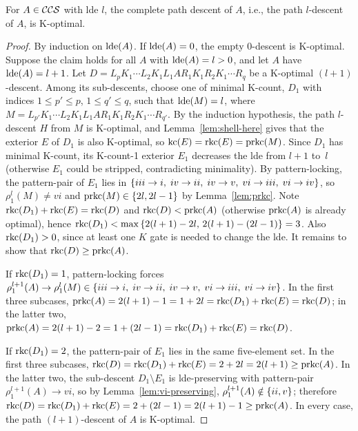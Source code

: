 \documentclass[reprint,amsmath,amssymb,aps,pra]{revtex4-2}
\begin{document}
\begin{lemma}
  For $A\in {\mathcal{CCS}}$ with lde $l$, the complete path descent of
  $A$, i.e., the path $l$-descent of $A$, is K-optimal.
\end{lemma}
\begin{proof}
  By induction on $\operatorname{lde}(A)$. If $\operatorname{lde}(A)=0$, the empty $0$-descent is
  K-optimal. Suppose the claim holds for all $A$ with
  $\operatorname{lde}(A) = l > 0$, and let $A$ have $\operatorname{lde}(A) = l+1$. Let
  $D = L_pK_1\cdots L_2K_1L_1AR_1K_1R_2K_1\cdots R_q$ be a K-optimal
  $(l+1)$-descent. Among its sub-descents, choose one of minimal
  K-count, $D_1$ with indices $1\le p'\le p$, $1\le q' \le q$, such
  that $\operatorname{lde}(M) = l$, where
  $M = L_{p'}K_1\cdots L_2K_1L_1AR_1K_1R_2K_1\cdots R_{q'}$. By the
  induction hypothesis, the path $l$-descent $H$ from $M$ is
  K-optimal, and Lemma~\ref{lem:shell-here} gives that the exterior
  $E$ of $D_1$ is also K-optimal, so $\operatorname{kc}(E) =\operatorname{rkc}(E) =
  \operatorname{prkc}(M)$. Since $D_1$ has minimal K-count, its K-count-1 exterior
  $E_1$ decreases the lde from $l+1$ to~$l$ (otherwise $E_1$ could be
  stripped, contradicting minimality). By pattern-locking, the
  pattern-pair of $E_1$ lies in
  $ \left\{iii \rightarrow i,\; iv \rightarrow ii,\; iv \rightarrow v,\;
    vi \rightarrow iii,\; vi \rightarrow iv\right\}$, so
  $\rho^l_1(M) \neq vi$ and $\operatorname{prkc}(M) \in \left\{2l, 2l-1\right\}$ by
  Lemma~\ref{lem:prkc}. Note $\operatorname{rkc}(D_1) + \operatorname{rkc}(E)= \operatorname{rkc}(D)$ and
  $\operatorname{rkc}(D) < \operatorname{prkc}(A)$ (otherwise $\operatorname{prkc}(A)$ is already optimal),
  hence $\operatorname{rkc}(D_1) < \max\left\{2(l+1) - 2l,\, 2(l+1) - (2l-1)\right\} = 3$.
  Also $\operatorname{rkc}(D_1) > 0$, since at least one $K$ gate is needed to
  change the lde. It remains to show that $\operatorname{rkc}(D) \ge \operatorname{prkc}(A)$.

  If $\operatorname{rkc}(D_1) = 1$, pattern-locking forces
  $\rho^{l+1}_1(A) \rightarrow \rho^l_1(M) \in \left\{iii \rightarrow i,\;
    iv \rightarrow ii,\; iv \rightarrow v,\; vi \rightarrow iii,\; vi
    \rightarrow iv\right\}$. In the first three subcases,
  $\operatorname{prkc}(A) = 2(l+1) - 1 = 1 + 2l = \operatorname{rkc}(D_1) + \operatorname{rkc}(E) = \operatorname{rkc}(D)$; in
  the latter two,
  $\operatorname{prkc}(A) = 2(l+1) - 2 = 1 + (2l-1) = \operatorname{rkc}(D_1) + \operatorname{rkc}(E) =
  \operatorname{rkc}(D)$.

  If $\operatorname{rkc}(D_1) = 2$, the pattern-pair of $E_1$ lies in the same
  five-element set. In the first three subcases,
  $\operatorname{rkc}(D) = \operatorname{rkc}(D_1) + \operatorname{rkc}(E) = 2 + 2l = 2(l+1) \ge \operatorname{prkc}(A)$. In
  the latter two, the sub-descent $D_1\setminus E_1$ is lde-preserving
  with pattern-pair $\rho^{l+1}_1(A) \rightarrow vi$, so by
  Lemma~\ref{lem:vi-preserving}, $\rho^{l+1}_1(A) \notin \left\{ii, v\right\}$;
  therefore
  $\operatorname{rkc}(D) = \operatorname{rkc}(D_1) + \operatorname{rkc}(E) = 2 + (2l-1) = 2(l+1) - 1 \ge
  \operatorname{prkc}(A)$. In every case, the path $(l+1)$-descent of $A$ is
  K-optimal.
\end{proof}
\end{document}
